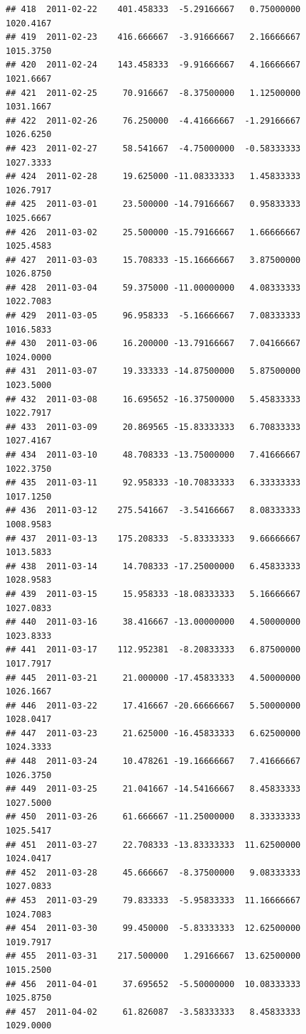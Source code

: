 \documentclass[
]{article}
\begin{document}
\begin{verbatim}
## 418  2011-02-22    401.458333  -5.29166667   0.75000000    1020.4167
## 419  2011-02-23    416.666667  -3.91666667   2.16666667    1015.3750
## 420  2011-02-24    143.458333  -9.91666667   4.16666667    1021.6667
## 421  2011-02-25     70.916667  -8.37500000   1.12500000    1031.1667
## 422  2011-02-26     76.250000  -4.41666667  -1.29166667    1026.6250
## 423  2011-02-27     58.541667  -4.75000000  -0.58333333    1027.3333
## 424  2011-02-28     19.625000 -11.08333333   1.45833333    1026.7917
## 425  2011-03-01     23.500000 -14.79166667   0.95833333    1025.6667
## 426  2011-03-02     25.500000 -15.79166667   1.66666667    1025.4583
## 427  2011-03-03     15.708333 -15.16666667   3.87500000    1026.8750
## 428  2011-03-04     59.375000 -11.00000000   4.08333333    1022.7083
## 429  2011-03-05     96.958333  -5.16666667   7.08333333    1016.5833
## 430  2011-03-06     16.200000 -13.79166667   7.04166667    1024.0000
## 431  2011-03-07     19.333333 -14.87500000   5.87500000    1023.5000
## 432  2011-03-08     16.695652 -16.37500000   5.45833333    1022.7917
## 433  2011-03-09     20.869565 -15.83333333   6.70833333    1027.4167
## 434  2011-03-10     48.708333 -13.75000000   7.41666667    1022.3750
## 435  2011-03-11     92.958333 -10.70833333   6.33333333    1017.1250
## 436  2011-03-12    275.541667  -3.54166667   8.08333333    1008.9583
## 437  2011-03-13    175.208333  -5.83333333   9.66666667    1013.5833
## 438  2011-03-14     14.708333 -17.25000000   6.45833333    1028.9583
## 439  2011-03-15     15.958333 -18.08333333   5.16666667    1027.0833
## 440  2011-03-16     38.416667 -13.00000000   4.50000000    1023.8333
## 441  2011-03-17    112.952381  -8.20833333   6.87500000    1017.7917
## 445  2011-03-21     21.000000 -17.45833333   4.50000000    1026.1667
## 446  2011-03-22     17.416667 -20.66666667   5.50000000    1028.0417
## 447  2011-03-23     21.625000 -16.45833333   6.62500000    1024.3333
## 448  2011-03-24     10.478261 -19.16666667   7.41666667    1026.3750
## 449  2011-03-25     21.041667 -14.54166667   8.45833333    1027.5000
## 450  2011-03-26     61.666667 -11.25000000   8.33333333    1025.5417
## 451  2011-03-27     22.708333 -13.83333333  11.62500000    1024.0417
## 452  2011-03-28     45.666667  -8.37500000   9.08333333    1027.0833
## 453  2011-03-29     79.833333  -5.95833333  11.16666667    1024.7083
## 454  2011-03-30     99.450000  -5.83333333  12.62500000    1019.7917
## 455  2011-03-31    217.500000   1.29166667  13.62500000    1015.2500
## 456  2011-04-01     37.695652  -5.50000000  10.08333333    1025.8750
## 457  2011-04-02     61.826087  -3.58333333   8.45833333    1029.0000

\end{verbatim}
\end{document}
